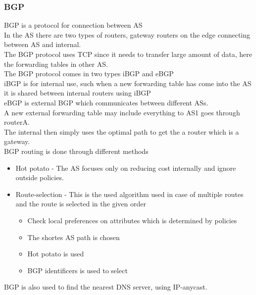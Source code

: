 \documentclass[12pt, a4paper]{article}
\begin{document}
			\subsubsection{BGP}
				BGP is a protocol for connection between AS\\
				In the AS there are two types of routers, gateway routers on the edge connecting between AS and internal.\\
				The BGP protocol uses TCP since it needs to transfer large amount of data, here the forwarding tables in other AS.\\
				The BGP protocol comes in two types iBGP and eBGP\\
				iBGP is for internal use, such when a new forwarding table has come into the AS it is shared between internal routers using iBGP\\
				eBGP is external BGP which communicates between different ASs.\\
				A new external forwarding table may include everything to AS1 goes through routerA.\\
				The internal then simply uses the optimal path to get the a router which is a gateway.\\
				BGP routing is done through different methods
				\begin{itemize}
					\item Hot potato - The AS focuses only on reducing cost internally and ignore outside policies.
					\item Route-selection - This is the used algorithm used in case of multiple routes and the route is selected in the given order
					\begin{itemize}
						\item Check local preferences on attributes which is determined by policies
						\item The shortes AS path is chosen
						\item Hot potato is used
						\item BGP identificers is used to select
					\end{itemize}
				\end{itemize}
				BGP is also used to find the nearest DNS server, using IP-anycast.
\end{document}
